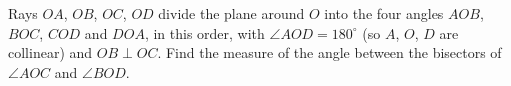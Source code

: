 Rays $OA$, $OB$, $OC$, $OD$ divide the plane around $O$ into the four angles $AOB$, $BOC$, $COD$ and $DOA$, in this order, with $\angle AOD=180^\circ$ (so $A$, $O$, $D$ are collinear) and $OB\perp OC$. Find the measure of the angle between the bisectors of $\angle AOC$ and $\angle BOD$.
